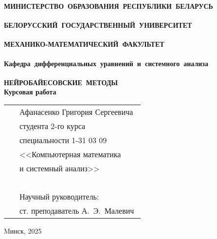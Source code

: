 \setcounter{page}{1}
\thispagestyle{empty}
\begin{center}
\bf
\vspace{4cm}
{
\mbox{МИНИСТЕРСТВО~ОБРАЗОВАНИЯ~РЕСПУБЛИКИ~БЕЛАРУСЬ} \\~\\
\mbox{БЕЛОРУССКИЙ~ГОСУДАРСТВЕННЫЙ~УНИВЕРСИТЕТ} \\~\\
\mbox{МЕХАНИКО-МАТЕМАТИЧЕСКИЙ~ФАКУЛЬТЕТ} \\~\\
\mbox{Кафедра~дифференциальных~уравнений~и~системного~анализа} \\~\\
}
\vspace{4cm}
\bf
\mbox{НЕЙРОБАЙЕСОВСКИЕ МЕТОДЫ}\\
\vspace{1cm}
\rm Курсовая работа
\vspace{3cm}
\end{center}

\begin{tabular}{ll}
\hspace{10.5cm}
&Афанасенко Григория Сергеевича~\\
&студента 2-го курса\\
&специальности 1-31 03 09\\
&<<Компьютерная математика\\
&и системный анализ>>\\~\\
&Научный руководитель:\\
&ст. преподаватель А.~Э.~Малевич
\end{tabular}
\vspace{4cm}
\begin{center}
    Mинск, 2025
\end{center}
\clearpage
\restoregeometry
